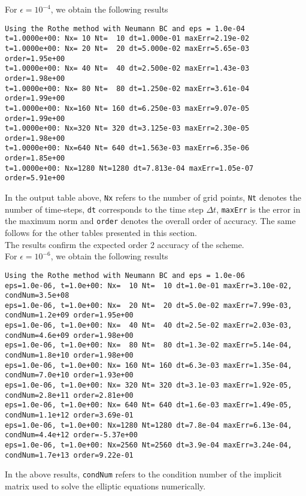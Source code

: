 \documentclass[11pt]{article}
\numberwithin{equation}{section}
\newcommand{\dt}{\Delta t}
\begin{document}
For $\epsilon = 10^{-4}$, we obtain the following results
\begin{footnotesize}
	\begin{Verbatim}[frame = single]
Using the Rothe method with Neumann BC and eps = 1.0e-04
t=1.0000e+00: Nx= 10 Nt=  10 dt=1.000e-01 maxErr=2.19e-02
t=1.0000e+00: Nx= 20 Nt=  20 dt=5.000e-02 maxErr=5.65e-03 order=1.95e+00
t=1.0000e+00: Nx= 40 Nt=  40 dt=2.500e-02 maxErr=1.43e-03 order=1.98e+00
t=1.0000e+00: Nx= 80 Nt=  80 dt=1.250e-02 maxErr=3.61e-04 order=1.99e+00
t=1.0000e+00: Nx=160 Nt= 160 dt=6.250e-03 maxErr=9.07e-05 order=1.99e+00
t=1.0000e+00: Nx=320 Nt= 320 dt=3.125e-03 maxErr=2.30e-05 order=1.98e+00
t=1.0000e+00: Nx=640 Nt= 640 dt=1.563e-03 maxErr=6.35e-06 order=1.85e+00
t=1.0000e+00: Nx=1280 Nt=1280 dt=7.813e-04 maxErr=1.05e-07 order=5.91e+00
	\end{Verbatim}
\end{footnotesize}
In the output table above, \texttt{Nx} refers to the number of grid points, \texttt{Nt} denotes the number of time-steps, \texttt{dt} corresponds to the time step $\dt$, \texttt{maxErr} is the error in the maximum norm and \texttt{order}
denotes the overall order of accuracy. The same follows for the other tables presented in this section.\\

The results confirm the expected order 2 accuracy of the scheme. \\

For $\epsilon = 10^{-6}$, we obtain the following results
\begin{footnotesize}
	\begin{Verbatim}[frame = single]
Using the Rothe method with Neumann BC and eps = 1.0e-06
eps=1.0e-06, t=1.0e+00: Nx=  10 Nt=  10 dt=1.0e-01 maxErr=3.10e-02, condNum=3.5e+08
eps=1.0e-06, t=1.0e+00: Nx=  20 Nt=  20 dt=5.0e-02 maxErr=7.99e-03, condNum=1.2e+09 order=1.95e+00
eps=1.0e-06, t=1.0e+00: Nx=  40 Nt=  40 dt=2.5e-02 maxErr=2.03e-03, condNum=4.6e+09 order=1.98e+00
eps=1.0e-06, t=1.0e+00: Nx=  80 Nt=  80 dt=1.3e-02 maxErr=5.14e-04, condNum=1.8e+10 order=1.98e+00
eps=1.0e-06, t=1.0e+00: Nx= 160 Nt= 160 dt=6.3e-03 maxErr=1.35e-04, condNum=7.0e+10 order=1.93e+00
eps=1.0e-06, t=1.0e+00: Nx= 320 Nt= 320 dt=3.1e-03 maxErr=1.92e-05, condNum=2.8e+11 order=2.81e+00
eps=1.0e-06, t=1.0e+00: Nx= 640 Nt= 640 dt=1.6e-03 maxErr=1.49e-05, condNum=1.1e+12 order=3.69e-01
eps=1.0e-06, t=1.0e+00: Nx=1280 Nt=1280 dt=7.8e-04 maxErr=6.13e-04, condNum=4.4e+12 order=-5.37e+00
eps=1.0e-06, t=1.0e+00: Nx=2560 Nt=2560 dt=3.9e-04 maxErr=3.24e-04, condNum=1.7e+13 order=9.22e-01
	\end{Verbatim}
\end{footnotesize}
In the above results, \texttt{condNum} refers to the condition number of the implicit matrix used to solve the elliptic equations numerically. \\
\end{document}
